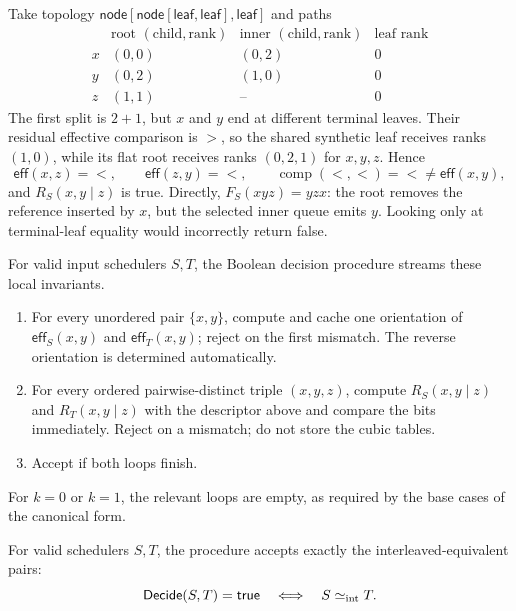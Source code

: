 \begin{example}
\label{ex:residual-pair-collapse}
Take topology
\(\mathsf{node}[\mathsf{node}[\mathsf{leaf},\mathsf{leaf}],
\mathsf{leaf}]\) and paths
\begin{equation}
\begin{array}{c|cc|c}
 & \text{root }(\text{child},\text{rank})
 & \text{inner }(\text{child},\text{rank})
 & \text{leaf rank}\\
\hline
x&(0,0)&(0,2)&0\\
y&(0,2)&(1,0)&0\\
z&(1,1)&\text{--}&0
\end{array}
\label{eq:residual-pair-example}
\end{equation}
The first split is \(2+1\), but \(x\) and \(y\) end at different terminal
leaves.  Their residual effective comparison is \(>\), so the shared
synthetic leaf receives ranks \((1,0)\), while its flat root receives ranks
\((0,2,1)\) for \(x,y,z\).  Hence
\[
 \mathsf{eff}(x,z)=<,\qquad
 \mathsf{eff}(z,y)=<,\qquad
 \operatorname{comp}(<,<)=<\ne\mathsf{eff}(x,y),
\]
and \(R_S(x,y\mid z)\) is true.  Directly, \(F_S(xyz)=yzx\): the root removes
the reference inserted by \(x\), but the selected inner queue emits \(y\).
Looking only at terminal-leaf equality would incorrectly return false.
\end{example}

For valid input schedulers \(S,T\), the Boolean decision procedure streams
these local invariants.
\begin{enumerate}
\item For every unordered pair \(\{x,y\}\), compute and cache one orientation
      of \(\mathsf{eff}_S(x,y)\) and \(\mathsf{eff}_T(x,y)\); reject on the
      first mismatch.  The reverse orientation is determined automatically.
\item For every ordered pairwise-distinct triple \((x,y,z)\), compute
      \(R_S(x,y\mid z)\) and \(R_T(x,y\mid z)\) with the descriptor above and
      compare the bits immediately.  Reject on a mismatch; do not store the
      cubic tables.
\item Accept if both loops finish.
\end{enumerate}
For \(k=0\) or \(k=1\), the relevant loops are empty, as required by the base
cases of the canonical form.

\begin{theorem}
\label{thm:structural-decision}
For valid schedulers \(S,T\), the procedure accepts exactly the
interleaved-equivalent pairs:
\begin{equation}
 \mathsf{Decide}(S,T)=\mathsf{true}
 \quad\Longleftrightarrow\quad
 S\mathrel{\simeq_{\mathrm{int}}} T.
 \label{eq:structural-decision-correct}
\end{equation}
\end{theorem}

